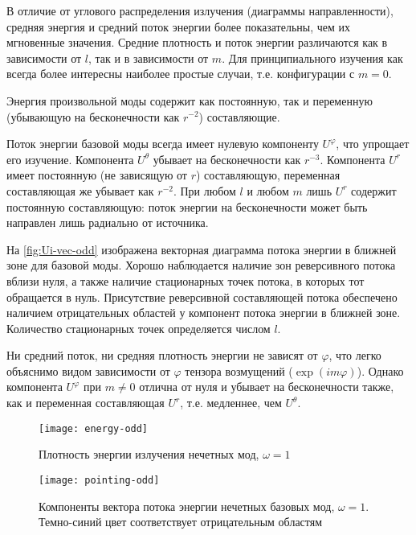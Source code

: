 \documentclass[\docroot/reports/draft/report.tex]{subfiles}
\begin{document}
    В отличие от углового распределения излучения (диаграммы направленности), средняя энергия и средний поток энергии более показательны, чем их мгновенные значения. Средние плотность и поток энергии различаются как в зависимости от $l$, так и в зависимости от $m$. Для принципиального изучения как всегда более интересны наиболее простые случаи, т.е. конфигурации с $m=0$.

    Энергия произвольной моды содержит как постоянную, так и переменную (убывающую на бесконечности как $r^{-2}$) составляющие.

    Поток энергии базовой моды всегда имеет нулевую компоненту $U^\varphi$, что упрощает его изучение. Компонента $U^\theta$ убывает на бесконечности как $r^{-3}$. Компонента $U^r$ имеет постоянную (не зависящую от $r$) составляющую, переменная составляющая же убывает как $r^{-2}$. При любом $l$ и любом $m$ лишь $U^r$ содержит постоянную составляющую: поток энергии на бесконечности может быть направлен лишь радиально от источника.

    На \autoref{fig:Ui-vec-odd} изображена векторная диаграмма потока энергии в ближней зоне для базовой моды. Хорошо наблюдается наличие зон реверсивного потока вблизи нуля, а также наличие стационарных точек потока, в которых тот обращается в нуль. Присутствие реверсивной составляющей потока обеспечено наличием отрицательных областей у компонент потока энергии в ближней зоне. Количество стационарных точек определяется числом $l$.

    Ни средний поток, ни средняя плотность энергии не зависят от $\varphi$, что легко объяснимо видом зависимости от $\varphi$ тензора возмущений ($\exp(i m \varphi)$). Однако компонента $U^\varphi$ при $ m \neq 0$ отлична от нуля и убывает на бесконечности также, как и переменная составляющая $U^r$, т.е. медленнее, чем $U^\theta$.

    \begin{figure}[!htb]%
        \centering\texttt{[image: energy-odd]}%
        \caption[]{Плотность энергии излучения нечетных мод, $\omega = 1$}%
        \label{fig:eps-odd}%
    \end{figure}

    \begin{figure}[!htb]%
        \centering\texttt{[image: pointing-odd]}%
        \caption[]{Компоненты вектора потока энергии нечетных базовых мод, $\omega = 1$. Темно-синий цвет соответствует отрицательным областям}%
        \label{fig:Ui-odd}%
    \end{figure}
\end{document}

